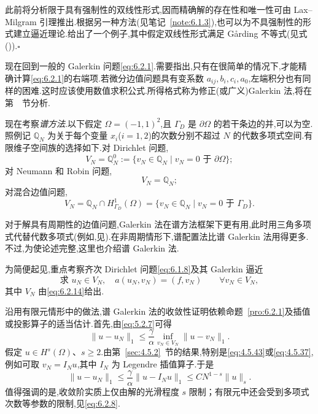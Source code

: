 \begin{note}
此前将分析限于具有强制性的双线性形式,因而精确解的存在性和唯一性可由 Lax--Milgram 引理推出.根据另一种方法(见笔记~\ref{note:6.1.3}),也可以为不具强制性的形式建立逼近理论.给出了一个例子,其中假定双线性形式满足 Gårding 不等式(见式()).\hfill\(\square\)
\end{note}

现在回到一般的 Galerkin 问题\eqref{eq:6.2.1}.需要指出,只有在很简单的情况下,才能精确计算\eqref{eq:6.2.1}的右端项.若微分边值问题具有变系数 \(a_{ij},b_i,c_i,a_0\),左端积分也有同样的困难.这时应该使用数值求积公式.所得格式称为修正(或广义)Galerkin 法,将在第~~节分析.

现在考察\emph{谱方法}.以下假定 \(\Omega=(-1,1)^2\),且 \(\Gamma_D\) 是 \(\partial\Omega\) 的若干条边的并,可以为空.照例记 \(\mathbb Q_N\) 为关于每个变量 \(x_i\)(\(i=1,2\))的次数分别不超过 \(N\) 的代数多项式空间.有限维子空间族的选择如下.对 Dirichlet 问题,
\begin{equation}\label{eq:6.2.14}
  V_N=\mathbb Q_N^0:=\{v_N\in\mathbb Q_N\mid v_N=0\text{ 于 }\partial\Omega\};
\end{equation}
对 Neumann 和 Robin 问题,
\begin{equation}\label{eq:6.2.15}
  V_N=\mathbb Q_N;
\end{equation}
对混合边值问题,
\begin{equation}\label{eq:6.2.16}
  V_N=\mathbb Q_N\cap H^1_{\Gamma_D}(\Omega)
   =\{v_N\in\mathbb Q_N\mid v_N=0\text{ 于 }\Gamma_D\}.
\end{equation}

对于解具有周期性的边值问题,Galerkin 法在谱方法框架下更有用,此时用三角多项式代替代数多项式(例如,见).在非周期情形下,谱配置法比谱 Galerkin 法用得更多.不过,为使论述完整,这里也介绍谱 Galerkin 法.

为简便起见,重点考察齐次 Dirichlet 问题\eqref{eq:6.1.8}及其 Galerkin 逼近
\begin{equation}\label{eq:6.2.17}
  \text{求 }u_N\in V_N,\quad a(u_N,v_N)=(f,v_N)\qquad\forall v_N\in V_N,
\end{equation}
其中 \(V_N\) 由\eqref{eq:6.2.14}给出.

沿用有限元情形中的做法,谱 Galerkin 法的收敛性证明依赖命题~\ref{pro:6.2.1}及插值或投影算子的适当估计.首先,由\eqref{eq:5.2.7}可得
\[
  \|u-u_N\|_1\le\frac\gamma\alpha\inf_{v_N\in V_N}\|u-v_N\|_1.
\]
假定 \(u\in H^s(\Omega)\)、\(s\ge2\).由第~\ref{sec:4.5.2}~节的结果,特别是\eqref{eq:4.5.43}或\eqref{eq:4.5.37},例如可取 \(v_N=I_Nu\),其中 \(I_N\) 为 Legendre 插值算子.于是
\begin{equation}\label{eq:6.2.18}
  \|u-u_N\|_1\le\frac\gamma\alpha\|u-I_Nu\|_1\le CN^{1-s}\|u\|_s.
\end{equation}
值得强调的是,收敛阶实质上仅由解的光滑程度 \(s\) 限制；有限元中还会受到多项式次数等参数的限制,见\eqref{eq:6.2.8}.

